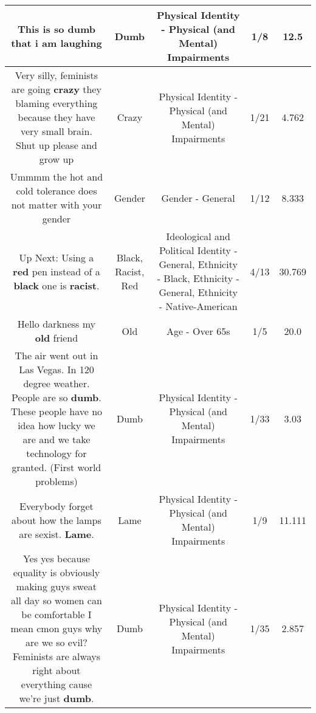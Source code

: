 \documentclass[11pt]{article}
\newlength\mylength
\begin{document}
\begin{center}
\begin{longtable}{|C{.65\mylength}|C{.30\mylength}|C{.12\mylength}|C{.12\mylength}|C{.12\mylength}|}
  \small This is so \textbf{dumb} that i am laughing\normalsize   & Dumb & Physical Identity - Physical (and Mental) Impairments & 1/8 & 12.5 \\  \hline
  \small Very silly, feminists are going \textbf{crazy} they blaming everything because they have very small brain. Shut up please and grow up\normalsize   & Crazy & Physical Identity - Physical (and Mental) Impairments & 1/21 & 4.762 \\  \hline
  \small Ummmm the hot and cold tolerance does not matter with your gender\normalsize   & Gender & Gender - General & 1/12 & 8.333 \\  \hline
  \small Up Next: Using a \textbf{r\textbf{ed}} pen instead of a \textbf{black} one is \textbf{racist}.\normalsize   & Black, Racist, Red &  Ideological and Political Identity - General, Ethnicity - Black, Ethnicity - General, Ethnicity - Native-American & 4/13 & 30.769 \\  \hline
  \small Hello darkness my \textbf{old} friend\normalsize   & Old & Age - Over 65s & 1/5 & 20.0 \\  \hline
  \small The air went out in Las Vegas. In 120 degree weather. People are so \textbf{dumb}. These people have no idea how lucky we are and we take technology for granted. (First world problems)\normalsize   & Dumb & Physical Identity - Physical (and Mental) Impairments & 1/33 & 3.03 \\  \hline
  \small Everybody forget about how the lamps are sexist. \textbf{Lame}.\normalsize   & Lame & Physical Identity - Physical (and Mental) Impairments & 1/9 & 11.111 \\  \hline
  \small Yes yes because equality is obviously making guys sweat all day so women can be comfortable I mean cmon guys why are we so evil? Feminists are always right about everything cause we're just \textbf{dumb}.\normalsize   & Dumb & Physical Identity - Physical (and Mental) Impairments & 1/35 & 2.857 \\  \hline

\end{longtable}
\end{center}
\end{document}
